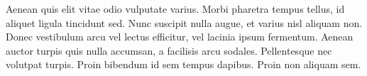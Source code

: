 Aenean quis elit vitae odio vulputate varius. Morbi pharetra tempus tellus, id aliquet ligula tincidunt sed. Nunc suscipit nulla augue, et varius nisl aliquam non. Donec vestibulum arcu vel lectus efficitur, vel lacinia ipsum fermentum. Aenean auctor turpis quis nulla accumsan, a facilisis arcu sodales. Pellentesque nec volutpat turpis. Proin bibendum id sem tempus dapibus. Proin non aliquam sem.

